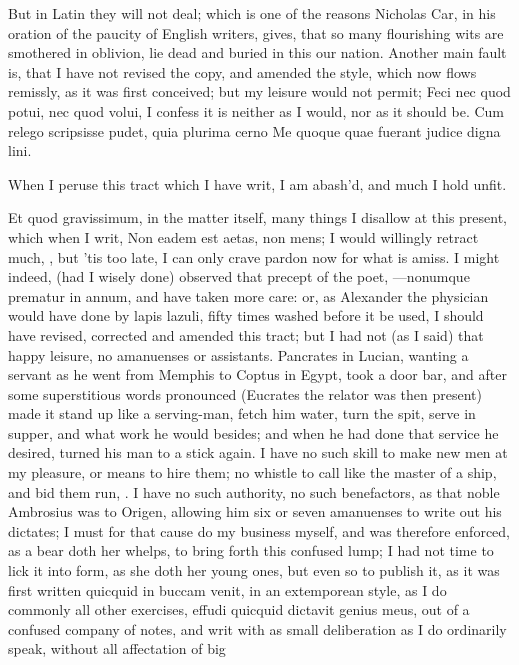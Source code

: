 {But in Latin they will not deal; which is one of the reasons
Nicholas Car, in his oration of the paucity of English writers,
gives, that so many flourishing wits are smothered in oblivion, lie
dead and buried in this our nation. Another main fault is, that I have
not revised the copy, and amended the style, which now flows remissly,
as it was first conceived; but my leisure would not permit; Feci nec
quod potui, nec quod volui, I confess it is neither as I would, nor as
it should be.
Cum relego scripsisse pudet, quia plurima cerno
Me quoque quae fuerant judice digna lini.

When I peruse this tract which I have writ,
I am abash'd, and much I hold unfit.

Et quod gravissimum, in the matter itself, many things I disallow at
this present, which when I writ, Non eadem est aetas, non mens; I
would willingly retract much, \etc, but 'tis too late, I can only crave
pardon now for what is amiss. I might indeed, (had I wisely done)
observed that precept of the poet, ---nonumque prematur in annum, and
have taken more care: or, as Alexander the physician would have done by
lapis lazuli, fifty times washed before it be used, I should have
revised, corrected and amended this tract; but I had not (as I said)
that happy leisure, no amanuenses or assistants. Pancrates in
Lucian, wanting a servant as he went from Memphis to Coptus in
Egypt, took a door bar, and after some superstitious words pronounced
(Eucrates the relator was then present) made it stand up like a
serving-man, fetch him water, turn the spit, serve in supper, and what
work he would besides; and when he had done that service he desired,
turned his man to a stick again. I have no such skill to make new men
at my pleasure, or means to hire them; no whistle to call like the
master of a ship, and bid them run, \etc. I have no such authority, no
such benefactors, as that noble Ambrosius was to Origen, allowing
him six or seven amanuenses to write out his dictates; I must for that
cause do my business myself, and was therefore enforced, as a bear doth
her whelps, to bring forth this confused lump; I had not time to lick
it into form, as she doth her young ones, but even so to publish it, as
it was first written quicquid in buccam venit, in an extemporean style,
as I do commonly all other exercises, effudi quicquid dictavit
genius meus, out of a confused company of notes, and writ with as small
deliberation as I do ordinarily speak, without all affectation of big
}

